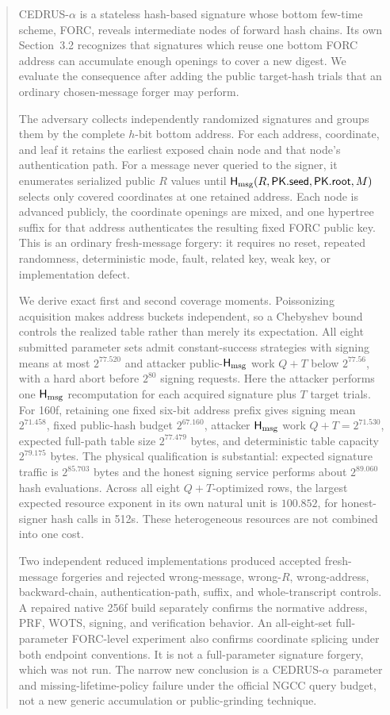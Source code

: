 \documentclass[11pt,a4paper]{article}
\newcommand{\Hmsg}{\ensuremath{\mathsf{H}_{\rm msg}}}
\newcommand{\pk}{\ensuremath{\mathsf{PK}}}
\begin{document}
\begin{abstract}
CEDRUS-$\alpha$ is a stateless hash-based signature whose bottom few-time
scheme, FORC, reveals intermediate nodes of forward hash chains.  Its own
Section~3.2 recognizes that signatures which reuse one bottom FORC address can
accumulate enough openings to cover a new digest.  We evaluate the consequence
after adding the public target-hash trials that an ordinary chosen-message
forger may perform.

The adversary collects independently randomized signatures and groups them by
the complete $h$-bit bottom address.  For each address, coordinate, and leaf it
retains the earliest exposed chain node and that node's authentication path.
For a message never queried to the signer, it enumerates serialized public
$R$ values until $\Hmsg(R,\pk.\mathsf{seed},\pk.\mathsf{root},M)$ selects only
covered coordinates at one retained address.  Each node is advanced publicly,
the coordinate openings are mixed, and one hypertree suffix for that address
authenticates the resulting fixed FORC public key.  This is an ordinary
fresh-message forgery: it requires no reset, repeated randomness, deterministic
mode, fault, related key, weak key, or implementation defect.

We derive exact first and second coverage moments.  Poissonizing acquisition
makes address buckets independent, so a Chebyshev bound controls the realized
table rather than merely its expectation.  All eight submitted parameter sets
admit constant-success strategies with signing means at most $2^{77.520}$ and
attacker public-$\Hmsg$ work $Q+T$ below $2^{77.56}$, with a hard abort before
$2^{80}$ signing requests.  Here the attacker performs one $\Hmsg$
recomputation for each acquired signature plus $T$ target trials.  For 160f,
retaining one fixed six-bit address
prefix gives signing mean $2^{71.458}$, fixed public-hash budget $2^{67.160}$,
attacker $\Hmsg$ work $Q+T=2^{71.530}$, expected full-path table size $2^{77.479}$
bytes, and deterministic table capacity $2^{79.175}$ bytes.  The physical
qualification is substantial: expected signature traffic is $2^{85.703}$
bytes and the honest signing service performs about $2^{89.060}$ hash
evaluations.  Across all eight $Q+T$-optimized rows, the largest expected
resource exponent in its own natural unit is $100.852$, for honest-signer hash
calls in 512s.  These heterogeneous resources are not combined into one cost.

Two independent reduced implementations produced accepted fresh-message
forgeries and rejected wrong-message, wrong-$R$, wrong-address, backward-chain,
authentication-path, suffix, and whole-transcript controls.  A repaired native
256f build separately confirms the normative address, PRF, WOTS, signing, and
verification behavior.  An all-eight-set full-parameter FORC-level experiment
also confirms coordinate splicing under both endpoint conventions.  It is not
a full-parameter signature forgery, which was not run.  The narrow new
conclusion is a CEDRUS-$\alpha$
parameter and missing-lifetime-policy failure under the official NGCC query
budget, not a new generic accumulation or public-grinding technique.
\end{abstract}
\end{document}
